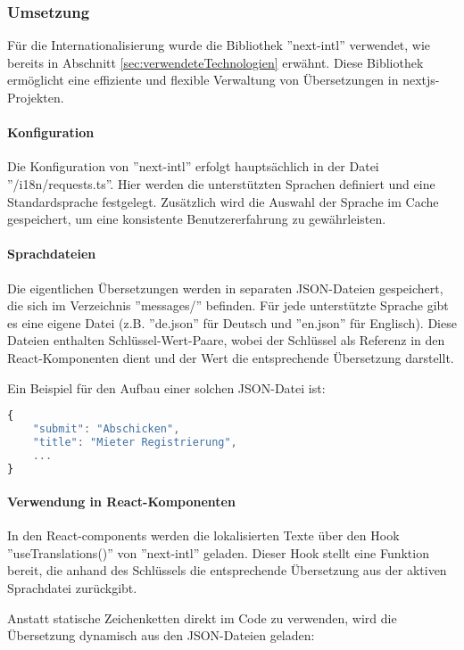 \subsubsection{Umsetzung}
Für die Internationalisierung wurde die Bibliothek ''next-intl'' verwendet, wie bereits in Abschnitt \ref{sec:verwendeteTechnologien} erwähnt. Diese Bibliothek ermöglicht eine effiziente und flexible Verwaltung von Übersetzungen in \gls{nextjs}-Projekten.

\paragraph{Konfiguration}
Die Konfiguration von ''next-intl'' erfolgt hauptsächlich in der Datei ''/i18n/requests.ts''. Hier werden die unterstützten Sprachen definiert und eine Standardsprache festgelegt. Zusätzlich wird die Auswahl der Sprache im Cache gespeichert, um eine konsistente Benutzererfahrung zu gewährleisten.

\paragraph{Sprachdateien}
Die eigentlichen Übersetzungen werden in separaten JSON-Dateien gespeichert, die sich im Verzeichnis ''messages/'' befinden. Für jede unterstützte Sprache gibt es eine eigene Datei (z.B. ''de.json'' für Deutsch und ''en.json'' für Englisch). Diese Dateien enthalten Schlüssel-Wert-Paare, wobei der Schlüssel als Referenz in den React-Komponenten dient und der Wert die entsprechende Übersetzung darstellt.

Ein Beispiel für den Aufbau einer solchen JSON-Datei ist:

\begin{lstlisting}[language=JavaScript]
{
    "submit": "Abschicken",
    "title": "Mieter Registrierung",
    ...
}
\end{lstlisting}

\paragraph{Verwendung in React-Komponenten}
In den React-\gls{components} werden die lokalisierten Texte über den Hook ''useTranslations()'' von ''next-intl'' geladen. Dieser Hook stellt eine Funktion bereit, die anhand des Schlüssels die entsprechende Übersetzung aus der aktiven Sprachdatei zurückgibt.

\newpage

Anstatt statische Zeichenketten direkt im Code zu verwenden, wird die Übersetzung dynamisch aus den JSON-Dateien geladen:

